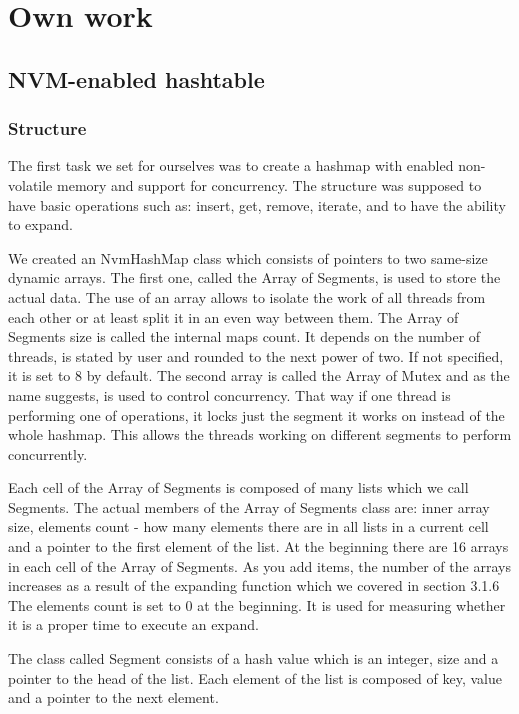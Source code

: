 
\chapter{Own work}

\section{NVM-enabled hashtable}

\subsection{Structure}

    The first task we set for ourselves was to create a hashmap with enabled non-volatile memory and support for concurrency. The structure was supposed to have basic operations such as: insert, get, remove, iterate, and to have the ability to expand. 
    
    We created an NvmHashMap class which consists of pointers to two same-size dynamic arrays. The first one, called the Array of Segments, is used to store the actual data. The use of an array allows to isolate the work of all threads from each other or at least split it in an even way between them. The Array of Segments size is called the internal maps count. It depends on the number of threads, is stated by user and rounded to the next power of two. If not specified, it is set to 8 by default. The second array is called the Array of Mutex and as the name suggests, is used to control concurrency. That way if one thread is performing one of operations, it locks just the segment it works on instead of the whole hashmap. This allows the threads working on different segments to perform concurrently.  
    
    Each cell of the Array of Segments is composed of many lists which we call Segments. The actual members of the Array of Segments class are: inner array size, elements count - how many elements there are in all lists in a current cell and a pointer to the first element of the list. 
    At the beginning there are 16 arrays in each cell of the Array of Segments. As you add items, the number of the arrays increases as a result of the expanding function which we covered in section 3.1.6
    The elements count is set to 0 at the beginning. It is used for measuring whether it is a proper time to execute an expand.
    
    The class called Segment consists of a hash value which is an integer, size and a pointer to the head of the list. Each element of the list is composed of key, value and a pointer to the next element. 
    
